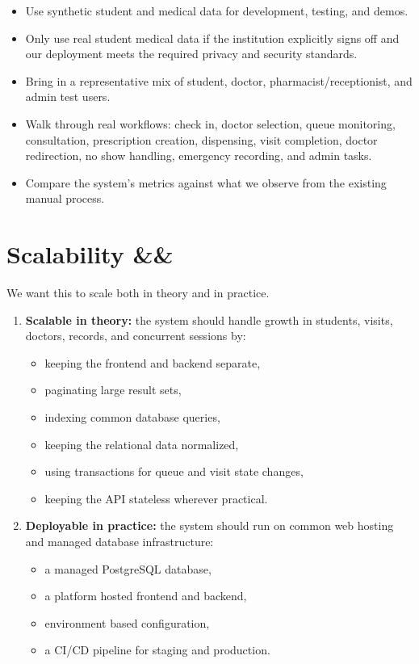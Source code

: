 \documentclass[11pt,a4paper]{article}
\newcommand{\BvrHint}[1]{%
  \ifx&#1&%
  \else
    {\normalfont\normalsize\itshape\hfill #1}%
  \fi}
\begin{document}
\begin{itemize}
    \item Use synthetic student and medical data for development, testing, and demos.
    \item Only use real student medical data if the institution explicitly signs off and our deployment meets the required privacy and security standards.
    \item Bring in a representative mix of student, doctor, pharmacist/receptionist, and admin test users.
    \item Walk through real workflows: check in, doctor selection, queue monitoring, consultation, prescription creation, dispensing, visit completion, doctor redirection, no show handling, emergency recording, and admin tasks.
    \item Compare the system's metrics against what we observe from the existing manual process.
\end{itemize}


\section{Scalability \BvrHint{}}

We want this to scale both in theory and in practice.

\begin{enumerate}
    \item \textbf{Scalable in theory:} the system should handle growth in students, visits, doctors, records, and concurrent sessions by:
    \begin{itemize}
        \item keeping the frontend and backend separate,
        \item paginating large result sets,
        \item indexing common database queries,
        \item keeping the relational data normalized,
        \item using transactions for queue and visit state changes,
        \item keeping the API stateless wherever practical.
    \end{itemize}
    \item \textbf{Deployable in practice:} the system should run on common web hosting and managed database infrastructure:
    \begin{itemize}
        \item a managed PostgreSQL database,
        \item a platform hosted frontend and backend,
        \item environment based configuration,
        \item a CI/CD pipeline for staging and production.
    \end{itemize}
\end{enumerate}
\end{document}
